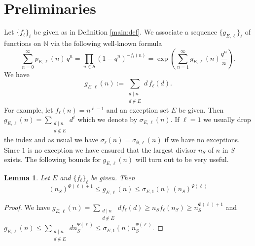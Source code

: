 \documentclass[12pt]{amsart}
\newtheorem{lemma}[theorem]{Lemma}
\theoremstyle{definition}
\theoremstyle{remark}
\numberwithin{theorem}{section} \numberwithin{equation}{section}
\begin{document}
\section{Preliminaries}\label{Preliminaries}
Let $\{f_{\ell}\}_{\ell}$ be given as in Definition \ref{main:def}.
We associate
a sequence $\{g_{E,\ell }\}_{\ell}$ of functions on $\mathbb{N}$
via the following well-known formula
\begin{equation}\label{exp}
\sum_{n=0}^{\infty} p_{E,\ell }(n) \, q^n = 
\prod_{n \in
{S}}
\left( 1 - q^n \right)^{-f_{\ell}(n)} = 
\exp \left( \sum_{n=1}^{\infty} g_{E,\ell }(n) \frac{q^n}{n}\right).
\end{equation}
We have
\begin{equation}
g_{E,\ell }(n):= \sum_{\substack{d \mid n \\ d \notin E}} d \, f_{\ell}(d).
\label{defg}
\end{equation}
For example, let $f_{\ell}(n)= n^{\ell -1}$ and an exception set $E$ be given.
Then $g_{E,\ell }(n) =\sum_{\substack{d \mid n \\ d \notin E}}
d^{\ell}$ which we denote by
$\sigma_{E,\ell }(n)$. If $\ell =1$ we usually drop the index and as usual we have
$\sigma_{\ell}(n) = \sigma_{\emptyset,\ell }(n)$ if we have no exceptions.
Since $1$ is no exception we have ensured that the largest divisor
$n_{{S}}$
of $n$ in $S$ exists. The following bounds for $g_{E,\ell }(n)$
will turn out to be very useful.
\begin{lemma} Let $E$ and $\{f_{\ell}\}_{\ell}$ be given. Then
\begin{equation}\label{eq:fundamental}
\left( n_{S}\right)^{\Phi(\ell)+1} \leq g_{E,\ell }(n) 
\leq \sigma_{E,1}(n) \, \left(n_{S}\right)^{\Psi(\ell)}
\end{equation}
\end{lemma}

\begin{proof}
We have
$g_{E,\ell }\left( n\right)
=\sum _{\substack{d\mid n \\ d\notin E}}df_{\ell }\left( d\right)
\geq n_{S}f_{\ell }\left( n_{S}\right)
\geq n_{S}^{\Phi \left(
\ell \right) +1}$
and
$g_{E,\ell }\left( n\right)
\leq \sum _{\substack{d\mid n \\ d\notin E}}dn_{S}^{\Psi \left( \ell \right) }
\leq \sigma _{E,1}\left( n\right) n_{S}^{\Psi \left( \ell \right) }$.
\end{proof}
\end{document}

